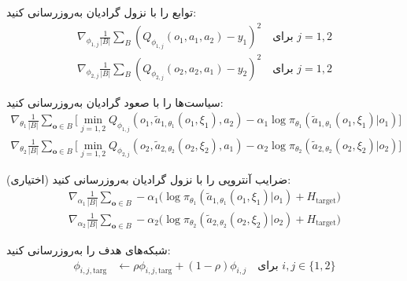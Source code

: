 \begin{algorithm}[H]
\begin{algorithmic}[1]
                    \State توابع  را با نزول گرادیان به‌روزرسانی کنید:
                    \vspace{-15pt}
                    \begin{align*}
                        \nabla_{\phi_{1,j}} \frac{1}{|B|}\sum_{B} \left( Q_{\phi_{1,j}}(o_1, a_1, a_2) - y_1 \right)^2 \quad \text{برای } j=1,2 \\
                        \nabla_{\phi_{2,j}} \frac{1}{|B|}\sum_{B} \left( Q_{\phi_{2,j}}(o_2, a_2, a_1) - y_2 \right)^2 \quad \text{برای } j=1,2
                    \end{align*}
                    \vspace{-30pt}
                    
                    \State سیاست‌ها را با صعود گرادیان به‌روزرسانی کنید:
                    \vspace{-15pt}
                    \begin{align*}
                        \nabla_{\theta_1} \frac{1}{|B|}\sum_{\boldsymbol{o} \in B}\Big[\min_{j=1,2} Q_{\phi_{1,j}}(o_1, \tilde{a}_{1,\theta_1}(o_1, \xi_1), a_2) - \alpha_1 \log \pi_{\theta_1}(\tilde{a}_{1,\theta_1}(o_1, \xi_1)|o_1) \Big] \\
                        \nabla_{\theta_2} \frac{1}{|B|}\sum_{\boldsymbol{o} \in B}\Big[\min_{j=1,2} Q_{\phi_{2,j}}(o_2, \tilde{a}_{2,\theta_2}(o_2, \xi_2), a_1) - \alpha_2 \log \pi_{\theta_2}(\tilde{a}_{2,\theta_2}(o_2, \xi_2)|o_2) \Big]
                    \end{align*}
                    \vspace{-35pt}
                    
                    \State ضرایب آنتروپی را با نزول گرادیان به‌روزرسانی کنید (اختیاری):
                    \vspace{-15pt}
                    \begin{align*}
                        \nabla_{\alpha_1} \frac{1}{|B|}\sum_{\boldsymbol{o} \in B} -\alpha_1 \Big(\log \pi_{\theta_1}(\tilde{a}_{1,\theta_1}(o_1, \xi_1)|o_1) + H_{\text{target}} \Big) \\
                        \nabla_{\alpha_2} \frac{1}{|B|}\sum_{\boldsymbol{o} \in B} -\alpha_2 \Big(\log \pi_{\theta_2}(\tilde{a}_{2,\theta_2}(o_2, \xi_2)|o_2) + H_{\text{target}} \Big)
                    \end{align*}
                    \vspace{-35pt}
                    
                    \State شبکه‌های هدف را به‌روزرسانی کنید:
                    \vspace{-15pt}
                    \begin{align*}
                        \phi_{i,j,\text{targ}} &\leftarrow \rho \phi_{i,j,\text{targ}} + (1-\rho) \phi_{i,j} \quad \text{برای } i,j \in \{1,2\}
                    \end{align*}
                \EndFor
            \EndIf
        \EndWhile
        \vspace{-15pt}
    \end{algorithmic}
\end{algorithm}

